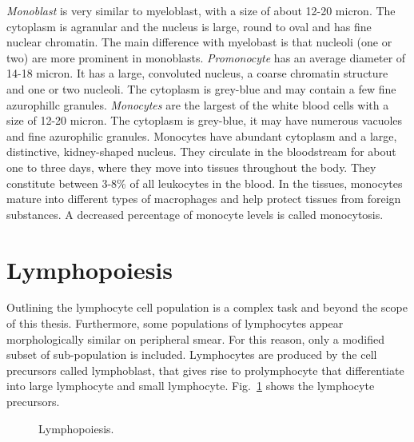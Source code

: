 \documentclass[final,a4paper,12pt,english]{UnicaPhdThesis3}
\begin{document}
	\textit{Monoblast} is very similar to myeloblast, with a size of about 12-20 micron. The cytoplasm is agranular and the nucleus is large, round to oval and has fine nuclear chromatin. The main difference with myelobast is that nucleoli (one or two) are more prominent in monoblasts. \textit{Promonocyte} has an average diameter of 14-18 micron. It has a large, convoluted nucleus, a coarse chromatin structure and one or two nucleoli. The cytoplasm is grey-blue and may contain a few fine azurophillc granules. \textit{Monocytes} are the largest of the white blood cells with a size of 12-20 micron. The cytoplasm is grey-blue, it may have numerous vacuoles and fine azurophilic granules. Monocytes have abundant cytoplasm and a large, distinctive, kidney-shaped nucleus. They circulate in the bloodstream for about one to three days, where they move into tissues throughout the body. They constitute between 3-8\% of all leukocytes in the blood. In the tissues, monocytes mature into different types of macrophages and help protect tissues from foreign substances. A decreased percentage of monocyte levels is called monocytosis.
	
	\section{Lymphopoiesis}
	Outlining the lymphocyte cell population is a complex task and beyond the scope of this thesis. Furthermore, some populations of lymphocytes appear morphologically similar on peripheral smear. For this reason, only a modified subset of sub-population is included. Lymphocytes are produced by the cell precursors called lymphoblast, that gives rise to prolymphocyte that differentiate into large lymphocyte and small lymphocyte.
	Fig.~\ref{fig:Lymphopoiesis} shows the lymphocyte precursors.
	
	\begin{figure}[!htbp]
		\centering
		\caption{\label{fig:Lymphopoiesis} Lymphopoiesis.}
	\end{figure}
	
\end{document}
